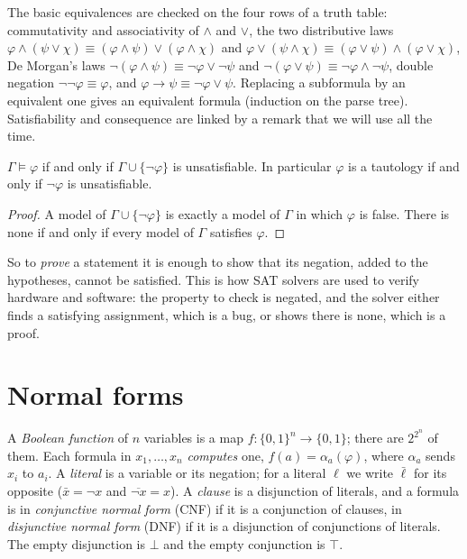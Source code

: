 The basic equivalences are checked on the four rows of a truth table: commutativity and associativity of $\land$ and
$\lor$, the two distributive laws $\varphi\land(\psi\lor\chi)\equiv(\varphi\land\psi)\lor(\varphi\land\chi)$ and
$\varphi\lor(\psi\land\chi)\equiv(\varphi\lor\psi)\land(\varphi\lor\chi)$, De Morgan's laws $\neg(\varphi\land\psi)\equiv\neg\varphi\lor\neg\psi$ and
$\neg(\varphi\lor\psi)\equiv\neg\varphi\land\neg\psi$, double negation $\neg\neg\varphi\equiv\varphi$, and $\varphi\to\psi\equiv\neg\varphi\lor\psi$. Replacing a
subformula by an equivalent one gives an equivalent formula (induction on the parse tree). Satisfiability and
consequence are linked by a remark that we will use all the time.

\begin{proposition}\label{prop:refute}
$\Gamma\models\varphi$ if and only if $\Gamma\cup\{\neg\varphi\}$ is unsatisfiable. In particular $\varphi$ is a tautology if and only
if $\neg\varphi$ is unsatisfiable.
\end{proposition}
\begin{proof}
A model of $\Gamma\cup\{\neg\varphi\}$ is exactly a model of $\Gamma$ in which $\varphi$ is false. There is none if and only if every
model of $\Gamma$ satisfies $\varphi$.
\end{proof}

So to \emph{prove} a statement it is enough to show that its negation, added to the hypotheses, cannot be
satisfied. This is how SAT solvers are used to verify hardware and software: the property to check is negated, and
the solver either finds a satisfying assignment, which is a bug, or shows there is none, which is a proof.

\section{Normal forms}

A \emph{Boolean function} of $n$ variables is a map $f\colon\{0,1\}^n\to\{0,1\}$; there are $2^{2^n}$ of them. Each formula in
$x_1,\dots,x_n$ \emph{computes} one, $f(a)=\alpha_a(\varphi)$, where $\alpha_a$ sends $x_i$ to $a_i$. A \emph{literal} is a variable or its
negation; for a literal $\ell$ we write $\bar\ell$ for its opposite ($\bar x=\neg x$ and $\overline{\neg x}=x$). A \emph{clause} is a
disjunction of literals, and a formula is in \emph{conjunctive normal form} (CNF) if it is a conjunction of clauses,
in \emph{disjunctive normal form} (DNF) if it is a disjunction of conjunctions of literals. The empty disjunction is
$\bot$ and the empty conjunction is $\top$.

